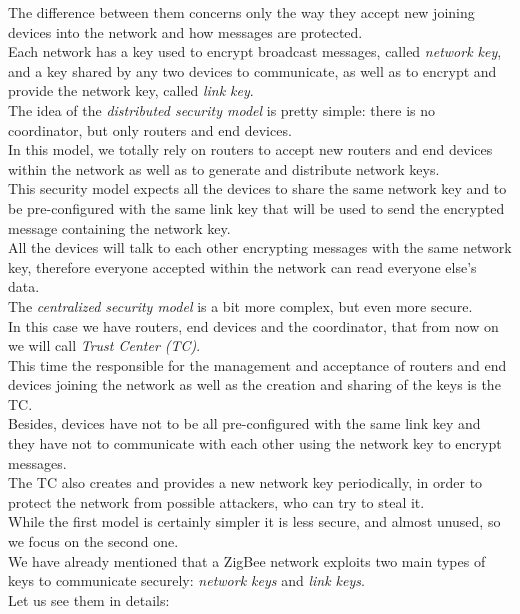 \documentclass[12pt]{report}
\begin{document}
{The difference between them concerns only the way they accept new joining devices into the network and how messages are protected.\\

Each network has a key used to encrypt broadcast messages, called \emph{network key}, and a key shared by any two devices to communicate, as well as to encrypt and provide the network key, called \emph{link key}.\\

The idea of the \emph{distributed security model} is pretty simple: there is no coordinator, but only routers and end devices.\\
In this model, we totally rely on routers to accept new routers and end devices within the network as well as to generate and distribute network keys.\\

This security model expects all the devices to share the same network key and to be pre-configured with the same link key that will be used to send the encrypted message containing the network key.\\
All the devices will talk to each other encrypting messages with the same network key, therefore everyone accepted within the network can read everyone else's data.\\

The \emph{centralized security model} is a bit more complex, but even more secure.\\
In this case we have routers, end devices and the coordinator, that from now on we will call \emph{Trust Center (TC)}.\\
This time the responsible for the management and acceptance of routers and end devices joining the network as well as the creation and sharing of the keys is the TC.\\
Besides, devices have not to be all pre-configured with the same link key and they have not to communicate with each other using the network key to encrypt messages.\\
The TC also creates and provides a new network key periodically, in order to protect the network from possible attackers, who can try to steal it.\\

While the first model is certainly simpler it is less secure, and almost unused, so we focus on the second one}.\\

{\setlength{\parindent}{0cm}
We have already mentioned that a ZigBee network exploits two main types of keys to communicate securely: \emph{network keys} and \emph{link keys}.\\
}
Let us see them in details:
\end{document}
